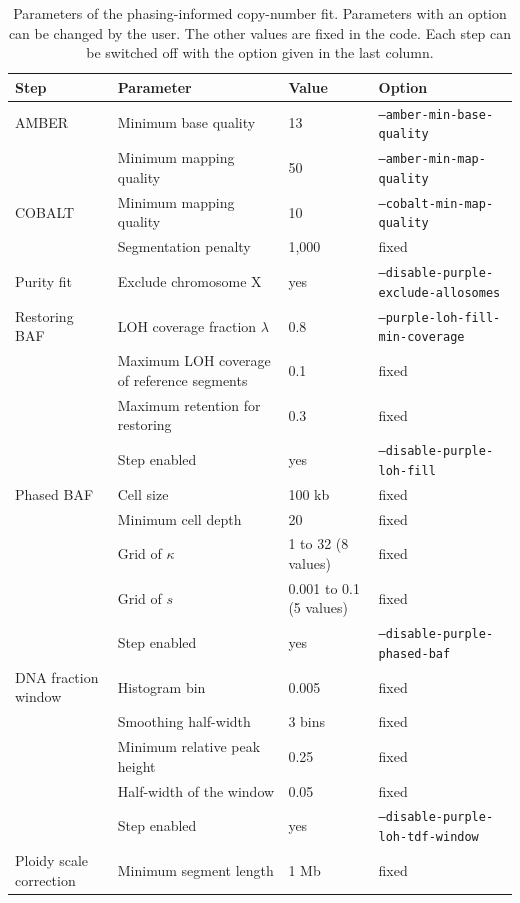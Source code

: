 \documentclass[pdflatex,sn-nature]{sn-jnl}
\begin{document}
\begin{table}[htbp]
  \centering
  \caption[Parameters of the phasing-informed copy-number fit]{Parameters of the phasing-informed copy-number fit. Parameters with an option can be changed by the user. The other values are fixed in the code. Each step can be switched off with the option given in the last column.}
  \label{tab:tdf-parameters}
  \footnotesize
  \begin{tabular}{@{}p{2.6cm}p{4.4cm}p{2.0cm}l@{}}
    \toprule
    Step & Parameter & Value & Option \\
    \midrule
    AMBER & Minimum base quality & 13 & \texttt{--amber-min-base-quality} \\
     & Minimum mapping quality & 50 & \texttt{--amber-min-map-quality} \\
    COBALT & Minimum mapping quality & 10 & \texttt{--cobalt-min-map-quality} \\
     & Segmentation penalty & 1,000 & fixed \\
    Purity fit & Exclude chromosome X & yes & \texttt{--disable-purple-exclude-allosomes} \\
    Restoring BAF & LOH coverage fraction $\lambda$ & 0.8 & \texttt{--purple-loh-fill-min-coverage} \\
     & Maximum LOH coverage of reference segments & 0.1 & fixed \\
     & Maximum retention for restoring & 0.3 & fixed \\
     & Step enabled & yes & \texttt{--disable-purple-loh-fill} \\
    Phased BAF & Cell size & 100 kb & fixed \\
     & Minimum cell depth & 20 & fixed \\
     & Grid of $\kappa$ & 1 to 32 (8 values) & fixed \\
     & Grid of $s$ & 0.001 to 0.1 (5 values) & fixed \\
     & Step enabled & yes & \texttt{--disable-purple-phased-baf} \\
    DNA fraction window & Histogram bin & 0.005 & fixed \\
     & Smoothing half-width & 3 bins & fixed \\
     & Minimum relative peak height & 0.25 & fixed \\
     & Half-width of the window & 0.05 & fixed \\
     & Step enabled & yes & \texttt{--disable-purple-loh-tdf-window} \\
    Ploidy scale correction & Minimum segment length & 1 Mb & fixed \\

\end{tabular}
\end{table}
\end{document}
